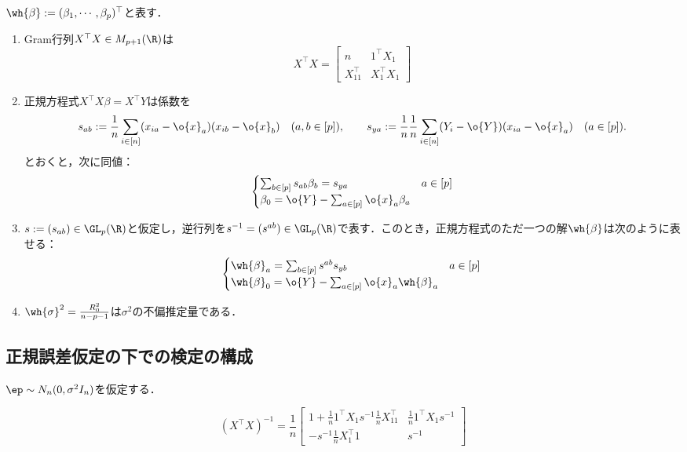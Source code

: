 \documentclass[uplatex,dvipdfmx]{jsreport}
\begin{document}
\begin{proposition}
    $\wh{\beta}:=(\beta_1,\cdots,\beta_p)^\top$と表す．
    \begin{enumerate}
        \item Gram行列$X^\top X\in M_{p+1}(\R)$は
        \[X^\top X=\begin{bmatrix}n&1^\top X_1\\X^\top_11&X_1^\top X_1\end{bmatrix}\]
        \item 正規方程式$X^\top X\beta=X^\top Y$は係数を
        \[s_{ab}:=\frac{1}{n}\sum_{i\in[n]}(x_{ia}-\o{x}_a)(x_{ib}-\o{x}_b)\quad(a,b\in[p]),\qquad s_{ya}:=\frac{1}{n}\frac{1}{n}\sum_{i\in[n]}(Y_i-\o{Y})(x_{ia}-\o{x}_a)\quad(a\in[p]).\]
        とおくと，次に同値：
        \[\begin{cases}
            \sum_{b\in[p]}s_{ab}\beta_b=s_{ya}&a\in[p]\\
            \beta_0=\o{Y}-\sum_{a\in[p]}\o{x}_a\beta_a
        \end{cases}\]
        \item $s:=(s_{ab})\in\GL_p(\R)$と仮定し，逆行列を$s^{-1}=(s^{ab})\in\GL_{p}(\R)$で表す．このとき，正規方程式のただ一つの解$\wh{\beta}$は次のように表せる：
        \[\begin{cases}
            \wh{\beta}_a=\sum_{b\in[p]}s^{ab}s_{yb}&a\in[p]\\
            \wh{\beta}_0=\o{Y}-\sum_{a\in[p]}\o{x}_a\wh{\beta}_a
        \end{cases}\]
        \item $\wh{\sigma}^2=\frac{R^2_0}{n-p-1}$は$\sigma^2$の不偏推定量である．
    \end{enumerate}
\end{proposition}

\subsection{正規誤差仮定の下での検定の構成}

\begin{tcolorbox}[colframe=ForestGreen, colback=ForestGreen!10!white,breakable,colbacktitle=ForestGreen!40!white,coltitle=black,fonttitle=\bfseries\sffamily,
title=]
    $\ep\sim N_n(0,\sigma^2I_n)$を仮定する．
\end{tcolorbox}

\begin{proposition}
    \[(X^\top X)^{-1}=\frac{1}{n}\begin{bmatrix}1+\frac{1}{n}1^\top X_1s^{-1}\frac{1}{n}X^\top_11&\frac{1}{n}1^\top X_1s^{-1}\\-s^{-1}\frac{1}{n}X_1^\top1&s^{-1}\end{bmatrix}\]
\end{proposition}
\end{document}
